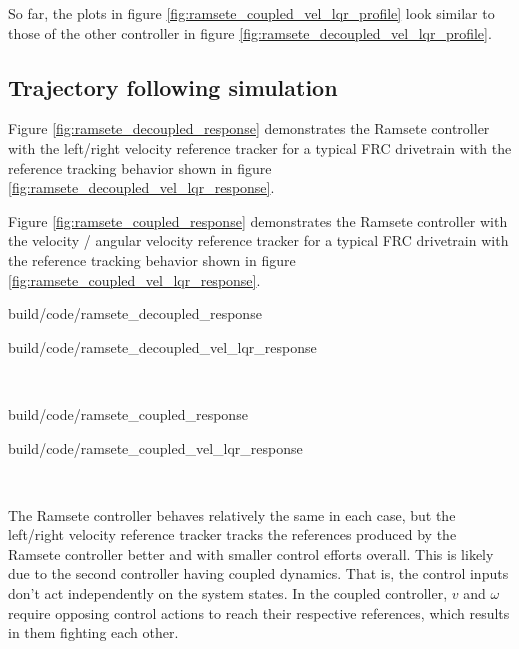 So far, the plots in figure \ref{fig:ramsete_coupled_vel_lqr_profile} look
similar to those of the other \gls{controller} in figure
\ref{fig:ramsete_decoupled_vel_lqr_profile}.

\subsection{Trajectory following simulation}

Figure \ref{fig:ramsete_decoupled_response} demonstrates the Ramsete controller
with the left/right velocity \gls{reference} tracker for a typical FRC
drivetrain with the \gls{reference} tracking behavior shown in figure
\ref{fig:ramsete_decoupled_vel_lqr_response}.

Figure \ref{fig:ramsete_coupled_response} demonstrates the Ramsete controller
with the velocity / angular velocity \gls{reference} tracker for a typical FRC
drivetrain with the \gls{reference} tracking behavior shown in figure
\ref{fig:ramsete_coupled_vel_lqr_response}.

\begin{bookfigure}
  \begin{minisvg}{build/code/ramsete_decoupled_response}
    \caption{Ramsete controller response with left/right velocity reference
      tracker ($b = 2$, $\zeta = 0.7$)}
    \label{fig:ramsete_decoupled_response}
  \end{minisvg}
  \hfill
  \begin{minisvg}{build/code/ramsete_decoupled_vel_lqr_response}
    \caption{Ramsete controller's left/right velocity reference tracker
      response}
    \label{fig:ramsete_decoupled_vel_lqr_response}
  \end{minisvg} \\
  \begin{minisvg}{build/code/ramsete_coupled_response}
    \caption{Ramsete controller response with velocity / angular velocity
      reference tracker ($b = 2$, $\zeta = 0.7$)}
    \label{fig:ramsete_coupled_response}
  \end{minisvg}
  \hfill
  \begin{minisvg}{build/code/ramsete_coupled_vel_lqr_response}
    \caption{Ramsete controller's velocity / angular velocity reference tracker
      response}
    \label{fig:ramsete_coupled_vel_lqr_response}
  \end{minisvg} \\
\end{bookfigure}

The Ramsete \gls{controller} behaves relatively the same in each case, but the
left/right velocity \gls{reference} tracker tracks the \glspl{reference}
produced by the Ramsete \gls{controller} better and with smaller
\glspl{control effort} overall. This is likely due to the second
\gls{controller} having coupled dynamics. That is, the control inputs don't act
independently on the system \glspl{state}. In the coupled \gls{controller}, $v$
and $\omega$ require opposing control actions to reach their respective
\glspl{reference}, which results in them fighting each other.

